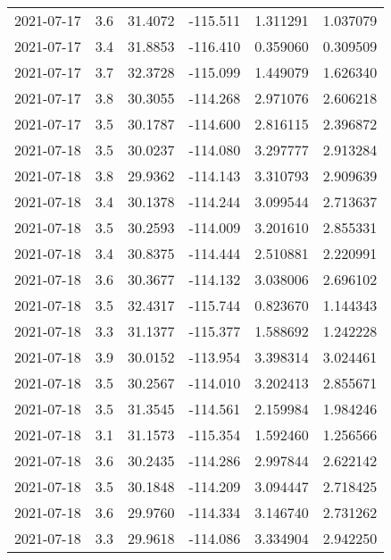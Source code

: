 \begin{tabular}{lrrrrr}
2021-07-17 &       3.6 &  31.4072 &  -115.511 &         1.311291 &         1.037079 \\
2021-07-17 &       3.4 &  31.8853 &  -116.410 &         0.359060 &         0.309509 \\
2021-07-17 &       3.7 &  32.3728 &  -115.099 &         1.449079 &         1.626340 \\
2021-07-17 &       3.8 &  30.3055 &  -114.268 &         2.971076 &         2.606218 \\
2021-07-17 &       3.5 &  30.1787 &  -114.600 &         2.816115 &         2.396872 \\
2021-07-18 &       3.5 &  30.0237 &  -114.080 &         3.297777 &         2.913284 \\
2021-07-18 &       3.8 &  29.9362 &  -114.143 &         3.310793 &         2.909639 \\
2021-07-18 &       3.4 &  30.1378 &  -114.244 &         3.099544 &         2.713637 \\
2021-07-18 &       3.5 &  30.2593 &  -114.009 &         3.201610 &         2.855331 \\
2021-07-18 &       3.4 &  30.8375 &  -114.444 &         2.510881 &         2.220991 \\
2021-07-18 &       3.6 &  30.3677 &  -114.132 &         3.038006 &         2.696102 \\
2021-07-18 &       3.5 &  32.4317 &  -115.744 &         0.823670 &         1.144343 \\
2021-07-18 &       3.3 &  31.1377 &  -115.377 &         1.588692 &         1.242228 \\
2021-07-18 &       3.9 &  30.0152 &  -113.954 &         3.398314 &         3.024461 \\
2021-07-18 &       3.5 &  30.2567 &  -114.010 &         3.202413 &         2.855671 \\
2021-07-18 &       3.5 &  31.3545 &  -114.561 &         2.159984 &         1.984246 \\
2021-07-18 &       3.1 &  31.1573 &  -115.354 &         1.592460 &         1.256566 \\
2021-07-18 &       3.6 &  30.2435 &  -114.286 &         2.997844 &         2.622142 \\
2021-07-18 &       3.5 &  30.1848 &  -114.209 &         3.094447 &         2.718425 \\
2021-07-18 &       3.6 &  29.9760 &  -114.334 &         3.146740 &         2.731262 \\
2021-07-18 &       3.3 &  29.9618 &  -114.086 &         3.334904 &         2.942250 \\

\end{tabular}
